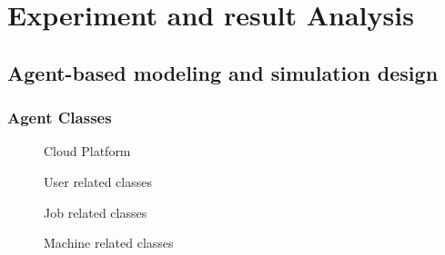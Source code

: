 \section{Experiment and result Analysis} %
\label{sec:Experiment_results}

\subsection{Agent-based modeling and simulation design} %
\label{sub:agent_based_modeling_and_simulation}
\subsubsection{Agent Classes}
\begin{figure}[htbp]
	\centering
	\tiny
	\begin{tikzpicture}
	
	\end{tikzpicture}
	\caption{Cloud Platform}
	\label{fig:platform}
\end{figure}
\begin{figure}[htbp]
    \centering
    \tiny
    \begin{tikzpicture}
    
    

    \end{tikzpicture}
    \caption{User related classes}
    \label{fig:userclassed}
\end{figure}
\begin{figure}[htbp]
    \centering
    \tiny
    \begin{tikzpicture}
    
    
    
    \end{tikzpicture}
    \caption{Job related classes}
    \label{fig:jobclassed}
\end{figure}
\begin{figure}[htbp]
    \centering
    \tiny
    \begin{tikzpicture}
    
    
    
    \end{tikzpicture}
    \caption{Machine related classes}
    \label{fig:machineclassed}
\end{figure}


